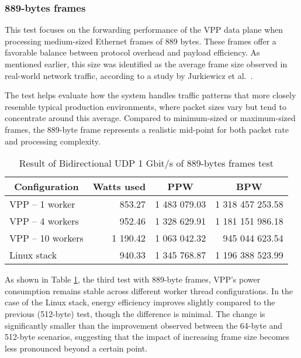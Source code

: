 \subsubsection{889-bytes frames}
This test focuses on the forwarding performance of the VPP data plane when processing medium-sized Ethernet frames of 889 bytes. 
These frames offer a favorable balance between protocol overhead and payload efficiency. 
As mentioned earlier, this size was identified as the average frame size observed in real-world network traffic, according to a study by Jurkiewicz et al.~\cite{JURKIEWICZ202115}.

The test helps evaluate how the system handles traffic patterns that more closely resemble typical production environments, where packet sizes vary but tend to concentrate around this average. 
Compared to minimum-sized or maximum-sized frames, the 889-byte frame represents a realistic mid-point for both packet rate and processing complexity.

\begin{table}[h!]
\centering
\begin{tabular}{|l|r|r|r|}
\hline
\multicolumn{1}{|c|}{\textbf{Configuration}} &
\multicolumn{1}{c|}{\textbf{Watts used}} &
\multicolumn{1}{c|}{\textbf{PPW}} &
\multicolumn{1}{c|}{\textbf{BPW}} \\
\hline
VPP -- 1 worker & 853.27 & 1 483 079.03 & 1 318 457 253.58 \\
VPP -- 4 workers & 952.46 & 1 328 629.91 & 1 181 151 986.18 \\
VPP -- 10 workers & 1 190.42 & 1 063 042.32 & 945 044 623.54 \\
Linux stack & 940.33 & 1 345 768.87 & 1 196 388 523.99 \\
\hline
\end{tabular}
\caption{Result of Bidirectional UDP 1 Gbit/s of 889-bytes frames test}
\label{tab:udp:three}
\end{table}

As shown in Table \ref{tab:udp:three}, the third test with 889-byte frames, 
VPP's power consumption remains stable across different worker thread configurations. 
In the case of the Linux stack, energy efficiency improves slightly compared to the previous (512-byte) test, though the difference is minimal. 
The change is significantly smaller than the improvement observed between the 64-byte and 512-byte scenarios, suggesting that the impact of increasing frame size becomes less pronounced beyond a certain point.

